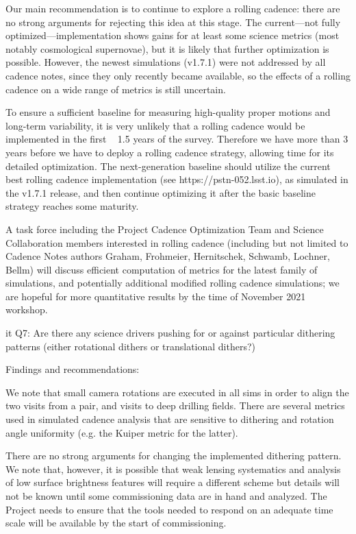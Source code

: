 Our main recommendation is to continue to explore a rolling cadence: there are no strong arguments for rejecting this idea at this stage. The current—not fully optimized—implementation shows gains for at least some science metrics (most notably cosmological supernovae), but it is likely that further optimization is possible. However, the newest simulations (v1.7.1) were not addressed by all cadence notes, since they only recently became available, so the effects of a rolling cadence on a wide range of metrics is still uncertain.

To ensure a sufficient baseline for measuring high-quality proper motions and long-term variability, it is very unlikely that a rolling cadence would be implemented in the first ~ 1.5 years of the survey. Therefore we have more than 3 years before we have to deploy a rolling cadence strategy, allowing time for its detailed optimization. The next-generation baseline should utilize the current best rolling cadence implementation (see https://pstn-052.lsst.io), as simulated in the v1.7.1 release, and then continue optimizing it after the basic baseline strategy reaches some maturity. 

A task force including the Project Cadence Optimization Team and Science Collaboration members interested in rolling cadence (including but not limited to Cadence Notes authors Graham, Frohmeier, Hernitschek, Schwamb, Lochner, Bellm) will discuss efficient computation of metrics for the latest family of simulations, and potentially additional modified rolling cadence simulations; we are hopeful for more quantitative results by the time of November 2021 workshop.


{it Q7:  Are there any science drivers pushing for or against particular dithering patterns (either rotational dithers or translational dithers?)  }

Findings and recommendations:

We note that small camera rotations are executed in all sims in order to align the two visits from a pair, and visits to deep drilling fields. There are several metrics used in simulated cadence analysis that are sensitive to dithering and rotation angle uniformity (e.g. the Kuiper metric for the latter). 

There are no strong arguments for changing the implemented dithering pattern. We note that, however, it is possible that weak lensing systematics and analysis of low surface brightness features will require a different scheme but details will not be known until some commissioning data are in hand and analyzed. The Project needs to ensure that the tools needed to respond on an adequate time scale will be available by the start of commissioning. 
 



